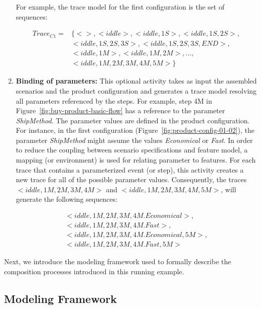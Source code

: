 \begin{enumerate}
For example, the trace model for the first configuration is the set of sequences:

\begin{small}
\begin{eqnarray*}
Trace_{C1} = & \{<>, <iddle>, <iddle, 1S>, <iddle, 1S,2S>, \\ 
                    & <iddle,1S,2S,3S>,  <iddle,1S,2S,3S,END>, \\ 
                    & <iddle, 1M>, <iddle, 1M,2M>, \ldots, \\ 
                    & <iddle, 1M, 2M,3M,4M,5M> \}
\end{eqnarray*}
\end{small}
 
 \item {\bf Binding of parameters:}  This optional activity takes as input the assembled scenarios and the product configuration and generates 
 a trace model resolving all parameters referenced by the steps. For example, step 4M in Figure~\ref{fig:buy-product-basic-flow} has a reference 
 to the parameter \emph{ShipMethod}. The parameter values are defined in the product configuration. For instance, in the 
 first configuration (Figure~\ref{fig:product-config-01-02}), the parameter \emph{ShipMethod} might assume the values \emph{Economical} or 
 \emph{Fast}. In order to reduce the coupling between scenario specifications and feature model, a mapping (or environment) is used for relating 
 parameter to features. For each trace that contains a parameterized event (or step), this activity creates a new trace for all of the possible parameter 
 values. Consequently, the traces $<iddle,1M,2M,3M,4M>$ and $<iddle, 1M, 2M, 3M, 4M, 5M>$, will generate the following sequences:
 
\begin{small}
\begin{eqnarray*}
<iddle,1M,2M,3M,4M.Economical>, \\ <iddle,1M,2M,3M,4M.Fast>, \\
<iddle,1M,2M,3M,4M.Economical,5M>, \\ <iddle,1M,2M,3M,4M.Fast, 5M>
\end{eqnarray*}
\end{small}
 
\end{enumerate}

Next, we introduce the modeling framework used to formally describe the composition processes introduced in this running example. 

\subsection{Modeling Framework}

